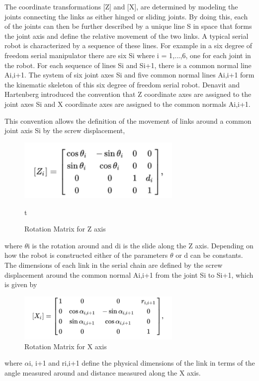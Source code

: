             The coordinate transformations [Z] and [X], are determined by modeling the joints connecting the links as either hinged or sliding joints. By doing this, each of the joints can then be further described by a unique line S in space that forms the joint axis and define the relative movement of the two links. A typical serial robot is characterized by a sequence of these lines. For example in a six degree of freedom serial manipulator there are six Si where i = 1,...,6, one for each joint in the robot. For each sequence of lines Si and Si+1, there is a common normal line Ai,i+1. The system of six joint axes Si and five common normal lines Ai,i+1 form the kinematic skeleton of this six degree of freedom serial robot. Denavit and Hartenberg introduced the convention that Z coordinate axes are assigned to the joint axes Si and X coordinate axes are assigned to the common normals Ai,i+1.

            This convention allows the definition of the movement of links around a common joint axis Si by the screw displacement,
            \begin{figure}[H]
                \centering
                \includegraphics[width=0.7\textwidth]{zframe.PNG}
                \caption{Rotation Matrix for Z axis}t
                \label{fig:RotationMatrixZAxis}
            \end{figure}
            where $\theta$i is the rotation around and di is the slide along the Z axis. Depending on how the robot is constructed either of the parameters $\theta$ or d can be constants. The dimensions of each link in the serial chain are defined by the screw displacement around the common normal Ai,i+1 from the joint Si to Si+1, which is given by
            \begin{figure}[H]
                \centering
                \includegraphics[width=0.7\textwidth]{xframe.PNG}
                \caption{Rotation Matrix for X axis}
                \label{fig:RotationMatrixXAxis}
            \end{figure}
            where $\alpha$i, i+1 and ri,i+1 define the physical dimensions of the link in terms of the angle measured around and distance measured along the X axis. 
            
